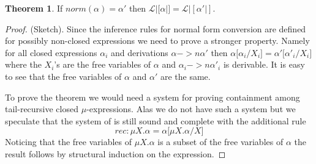 \documentclass[a4paper, oneside]{memoir}
\theoremstyle{definition}
\newtheorem{theorem}{Theorem}
\begin{document}
\begin{theorem}
  If $norm(\alpha) = \alpha'$ then $\mathcal{L} |[ \alpha |] = \mathcal{L} |[
  \alpha' |]$.

  \begin{proof} (Sketch).
    Since the inference rules for normal form conversion are defined for
    possibly non-closed expressions we need to prove a stronger property. Namely
    for all closed expressions $\alpha_i$ and derivations $\alpha ->n \alpha'$
    then $\alpha \lbrack \alpha_i / X_i \rbrack = \alpha' \lbrack \alpha'_i /
    X_i \rbrack$ where the $X_i$'s are the free variables of $\alpha$ and
    $\alpha_i ->n \alpha'_i$ is derivable. It is easy to see that the free
    variables of $\alpha$ and $\alpha'$ are the same.

    To prove the theorem we would need a system for proving containment among
    tail-recursive closed $\mu$-expressions. Alas we do not have such a system
    but we speculate that the system of \cite{heni2010} is still sound and
    complete with the additional rule
    \[
    rec : \mu X. \alpha = \alpha \lbrack \mu X. \alpha / X \rbrack
    \]
    Noticing that the free variables of $\mu X. \alpha$ is a subset of the free
    variables of $\alpha$ the result follows by structural induction on the
    expression.
  \end{proof}
\end{theorem}
\end{document}
